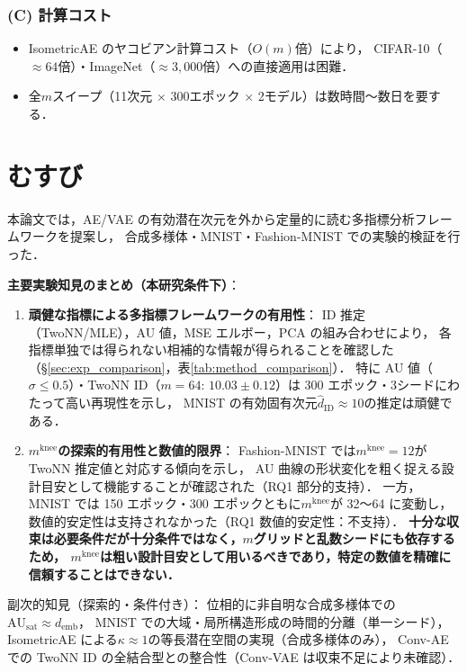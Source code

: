 \documentclass[11pt,a4paper]{jsarticle}
\newcommand{\kap}{\kappa}
\newcommand{\AUsat}{\mathrm{AU}_{\mathrm{sat}}}
\newcommand{\mknee}{m^{\mathrm{knee}}}
\newcommand{\demb}{d_{\mathrm{emb}}}
\begin{document}
\subsubsection*{(C) 計算コスト}

\begin{itemize}
  \item IsometricAE のヤコビアン計算コスト（$O(m)$倍）により，
        CIFAR-10（$\approx 64$倍）・ImageNet（$\approx 3{,}000$倍）への直接適用は困難．
  \item 全$m$スイープ（11次元 $\times$ 300エポック $\times$ 2モデル）は数時間〜数日を要する．
\end{itemize}

\section{むすび}\label{sec:conclusion}

本論文では，AE/VAE の有効潜在次元を外から定量的に読む多指標分析フレームワークを提案し，
合成多様体・MNIST・Fashion-MNIST での実験的検証を行った．

\textbf{主要実験知見のまとめ（本研究条件下）}：
\begin{enumerate}
  \item \textbf{頑健な指標による多指標フレームワークの有用性}：
        ID 推定（TwoNN/MLE），AU 値，MSE エルボー，PCA の組み合わせにより，
        各指標単独では得られない相補的な情報が得られることを確認した
        （§\ref{sec:exp_comparison}，表\ref{tab:method_comparison}）．
        特に AU 値（$\sigma \leq 0.5$）・TwoNN ID（$m=64$: $10.03 \pm 0.12$）は
        300 エポック・3シードにわたって高い再現性を示し，
        MNIST の有効固有次元$\hat{d}_\mathrm{ID} \approx 10$の推定は頑健である．
  \item \textbf{$\mknee$の探索的有用性と数値的限界}：
        Fashion-MNIST では$\mknee = 12$が TwoNN 推定値と対応する傾向を示し，
        AU 曲線の形状変化を粗く捉える設計目安として機能することが確認された（RQ1 部分的支持）．
        一方，MNIST では 150 エポック・300 エポックともに$\mknee$が 32〜64 に変動し，
        数値的安定性は支持されなかった（RQ1 数値的安定性：不支持）．
        \textbf{十分な収束は必要条件だが十分条件ではなく，$m$グリッドと乱数シードにも依存するため，
        $\mknee$は粗い設計目安として用いるべきであり，特定の数値を精確に信頼することはできない．}
\end{enumerate}

副次的知見（探索的・条件付き）：
位相的に非自明な合成多様体での$\AUsat \approx \demb$，
MNIST での大域・局所構造形成の時間的分離（単一シード），
IsometricAE による$\kap \approx 1$の等長潜在空間の実現（合成多様体のみ），
Conv-AE での TwoNN ID の全結合型との整合性（Conv-VAE は収束不足により未確認）．
\end{document}
